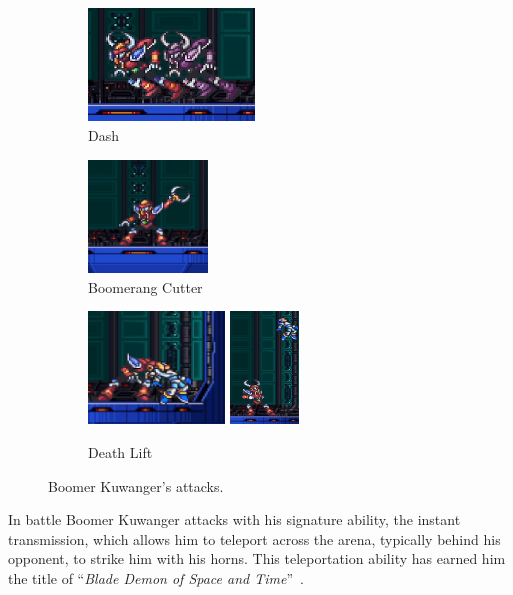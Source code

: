 \begin{figure}[htp]
	\centering
	\begin{subfigure}{0.4\linewidth}
		\centering
		\includegraphics[height=3cm]{figures/X1/Boomer_kuwanger/Boomer_dash.jpg}
		\caption{Dash}
	\end{subfigure}
	\begin{subfigure}{0.4\linewidth}
		\centering
		\includegraphics[height=3cm]{figures/X1/Boomer_kuwanger/Boomer_throw.jpg}
		\caption{Boomerang Cutter}
	\end{subfigure}
	\begin{subfigure}{\linewidth}
		\centering
		\includegraphics[height=3cm]{figures/X1/Boomer_kuwanger/Boomer_lift_1.jpg}
		\includegraphics[height=3cm]{figures/X1/Boomer_kuwanger/Boomer_lift_2.jpg}
		\caption{Death Lift}
	\end{subfigure}
	\caption{Boomer Kuwanger's attacks.}
\end{figure}
In battle Boomer Kuwanger attacks with his signature ability, the instant transmission, which allows him to teleport across the arena, typically behind his opponent, to strike him with his horns. This teleportation ability has earned him the title of  ``\textit{Blade Demon of Space and Time}''~\cite{book:MMX_Complete_art}. 

